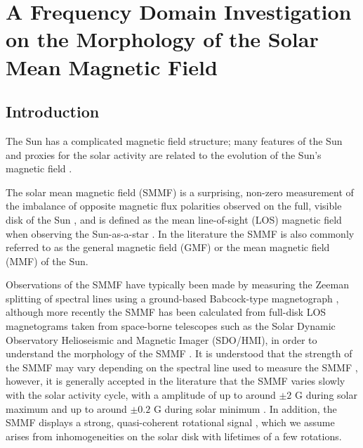 \chapter{A Frequency Domain Investigation on the Morphology of the Solar Mean Magnetic Field}\label{chap:SMMF}

\section{Introduction}\label{sec:SMMF_intro}

The Sun has a complicated magnetic field structure; many features of the Sun and proxies for the solar activity are related to the evolution of the Sun's magnetic field \citep{wu_solar_2018}.

The solar mean magnetic field (SMMF) is a surprising, non-zero measurement of the imbalance of opposite magnetic flux polarities observed on the full, visible disk of the Sun \citep{svalgaard_suns_1975}, and is defined as the mean line-of-sight (LOS) magnetic field when observing the Sun-as-a-star \citep{scherrer_mean_1977, scherrer_mean_1977-1, garcia_integrated_1999}. In the literature the SMMF is also commonly referred to as the general magnetic field (GMF) \citep{severny_time_1971} or the mean magnetic field (MMF) \citep{kotov_mean_2008} of the Sun.

Observations of the SMMF have typically been made by measuring the Zeeman splitting of spectral lines using a ground-based Babcock-type magnetograph \citep{scherrer_mean_1977}, although more recently the SMMF has been calculated from full-disk LOS magnetograms taken from space-borne telescopes such as the Solar Dynamic Observatory Helioseismic and Magnetic Imager (SDO/HMI), in order to understand the morphology of the SMMF \citep{kutsenko_contribution_2017, bose_variability_2018}. It is understood that the strength of the SMMF may vary depending on the spectral line used to measure the SMMF \citep{kotov_mean_2008, kotov_enigmas_2012}, however, it is generally accepted in the literature that the SMMF varies slowly with the solar activity cycle, with a amplitude of up to around $\pm 2$ G during solar maximum and up to around $\pm 0.2$ G during solar minimum \citep{plachinda_general_2011}. In addition, the SMMF displays a strong, quasi-coherent rotational signal \citep{chaplin_studies_2003, xie_temporal_2017}, which we assume arises from inhomogeneities on the solar disk with lifetimes of a few rotations.

